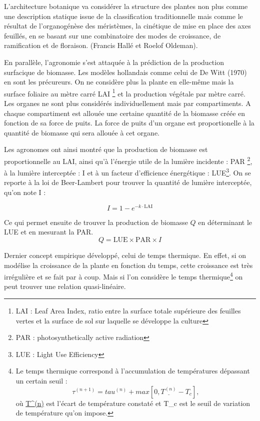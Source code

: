 L’architecture botanique va considérer la structure des plantes non plus comme une description statique issue de la classification traditionnelle mais comme le résultat de l’organogénèse des méristèmes, la cinétique de mise en place des axes feuillés, en se basant sur une combinatoire des modes de croissance, de ramification et de floraison. (Francis Hallé et Roelof Oldeman).

En parallèle, l’agronomie s’est attaquée à la prédiction de la production surfacique de biomasse. Les modèles hollandais comme celui de De Witt (1970) en sont les précureurs. On ne considère plus la plante en elle-même mais la surface foliaire au mètre carré LAI \footnote{LAI : Leaf Area Index, ratio entre la surface totale supérieure des feuilles vertes et la surface de sol sur laquelle se développe la culture} et la production végétale par mètre carré. Les organes ne sont plus considérés individuellement mais par compartiments. A chaque compartiment est allouée une certaine quantité de la biomasse créée en fonction de sa force de 
puits. La force de puits d'un organe est proportionelle à la quantité de biomasse qui sera allouée à cet organe.\cite[~p.229--231]{hopkins2003physiologie} 

Les agronomes ont ainsi montré que la production de biomasse est proportionnelle au LAI, ainsi qu'à l’énergie utile de la lumière incidente : PAR \footnote{PAR : photosynthetically active radiation }, à la lumière interceptée : I et à un facteur d’efficience énergétique : LUE\footnote{LUE : Light Use Efficiency}. On se reporte à la loi de Beer-Lambert pour trouver la quantité de lumière interceptée, qu'on note I : 

\[ I = 1-e^{-k\cdot\mathrm{LAI}} \]

Ce qui permet ensuite de trouver la production de biomasse $Q$
en déterminant le LUE et en mesurant la PAR.
\[ 
  Q = \mathrm{LUE}\times\mathrm{PAR}\times I 
\]

Dernier concept empirique développé, celui de temps thermique. En effet, si on modélise la croissance de la plante  en fonction du temps, cette croissance est très irrégulière et se fait par à coup. Mais si l’on considère le temps thermique\footnote{Le temps thermique correspond à l'accumulation de températures dépassant un certain seuil :
\[
\tau^{(n+1)} = tau^{(n)} + max[0, \underline{T^{(n)}} - T_c], 
\]
où \underline{T^{(n)}} est l'écart de température constaté et 
T_c est le seuil de variation de température qu'on impose.
} 
on peut trouver une relation quasi-linéaire.

